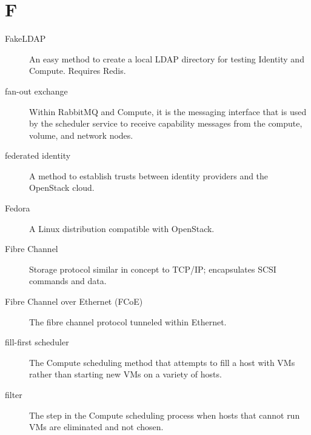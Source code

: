 \documentclass[letterpaper,10pt,english]{sphinxmanual}
\begin{document}
\section{F}
\label{_source/glossary:f}\begin{description}
\item[{FakeLDAP}] \leavevmode{}\label{_source/glossary:term-fakeldap}
An easy method to create a local LDAP directory for testing
Identity and Compute. Requires Redis.

\item[{fan-out exchange}] \leavevmode{}\label{_source/glossary:term-fan-out-exchange}
Within RabbitMQ and Compute, it is the messaging interface that
is used by the scheduler service to receive capability messages from
the compute, volume, and network nodes.

\item[{federated identity}] \leavevmode{}\label{_source/glossary:term-federated-identity}
A method to establish trusts between identity providers and the
OpenStack cloud.

\item[{Fedora}] \leavevmode{}\label{_source/glossary:term-fedora}
A Linux distribution compatible with OpenStack.

\item[{Fibre Channel}] \leavevmode{}\label{_source/glossary:term-fibre-channel}
Storage protocol similar in concept to TCP/IP; encapsulates SCSI
commands and data.

\item[{Fibre Channel over Ethernet (FCoE)}] \leavevmode{}\label{_source/glossary:term-fibre-channel-over-ethernet-fcoe}
The fibre channel protocol tunneled within Ethernet.

\item[{fill-first scheduler}] \leavevmode{}\label{_source/glossary:term-fill-first-scheduler}
The Compute scheduling method that attempts to fill a host with
VMs rather than starting new VMs on a variety of hosts.

\item[{filter}] \leavevmode{}\label{_source/glossary:term-filter}
The step in the Compute scheduling process when hosts that
cannot run VMs are eliminated and not chosen.


\end{description}
\end{document}
